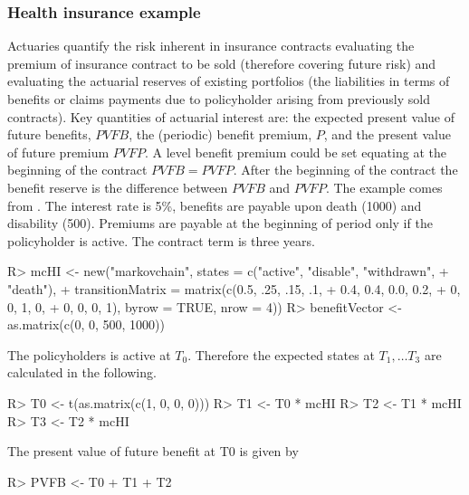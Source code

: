 \documentclass[nojss]{jss}
\begin{document}
\subsubsection{Health insurance example}\label{sec:hi}
Actuaries quantify the risk inherent in insurance contracts evaluating the premium of insurance contract to be sold (therefore covering future risk) and evaluating the actuarial reserves of existing portfolios (the liabilities in terms of benefits or claims payments due to policyholder arising from previously sold contracts).
Key quantities of actuarial interest are: the expected present value of future benefits, $PVFB$, the (periodic) benefit premium, $P$, and the present value of future premium $PVFP$. A level benefit premium could be set equating at the beginning of the contract $PVFB=PVFP$. After the beginning of the contract the benefit reserve is the difference between $PVFB$ and $PVFP$.
The example comes from \cite{deshmukh2012multiple}. The interest rate is 5\%, 
benefits are payable upon death (1000) and disability (500). Premiums are 
payable at the beginning of period only if the policyholder is active. The contract term is three years.

\begin{Schunk}
\begin{Sinput}
R> mcHI <- new("markovchain", states = c("active", "disable", "withdrawn", 
+                                        "death"),
+           transitionMatrix = matrix(c(0.5, .25, .15, .1,
+                                     0.4, 0.4, 0.0, 0.2,
+                                     0, 0, 1, 0,
+                                     0, 0, 0, 1), byrow = TRUE, nrow = 4))
R> benefitVector <- as.matrix(c(0, 0, 500, 1000))
\end{Sinput}
\end{Schunk}

The policyholders is active at $T_0$. Therefore the expected states at $T_1, \ldots T_3$ are calculated in the following.

\begin{Schunk}
\begin{Sinput}
R> T0 <- t(as.matrix(c(1, 0, 0, 0)))
R> T1 <- T0 * mcHI
R> T2 <- T1 * mcHI
R> T3 <- T2 * mcHI
\end{Sinput}
\end{Schunk}

The present value of future benefit at T0 is given by

\begin{Schunk}
\begin{Sinput}
R> PVFB <- T0 %
+    T1 %
+    T2 %
\end{Sinput}
\end{Schunk}
\end{document}
